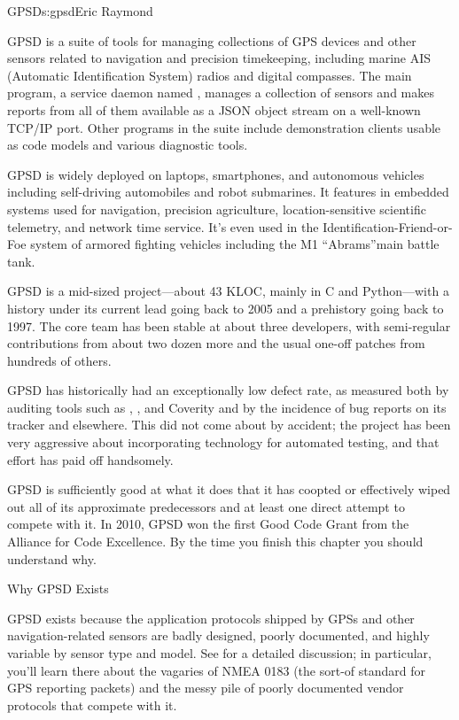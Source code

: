 \begin{aosachapter}{GPSD}{s:gpsd}{Eric Raymond}


GPSD is a suite of tools for managing collections of GPS devices and other
sensors related to navigation and precision timekeeping, including
marine AIS (Automatic Identification System) radios and digital compasses. The main program, a service
daemon named , manages a collection of sensors and makes
reports from all of them available as a JSON object stream on a
well-known TCP/IP port.  Other programs in the suite include 
demonstration clients usable as code models and various diagnostic
tools.

GPSD is widely deployed on laptops, smartphones, and autonomous
vehicles including self-driving automobiles and robot submarines. It
features in embedded systems used for navigation, precision
agriculture, location-sensitive scientific telemetry, and network time
service. It's even used in the Identification-Friend-or-Foe system of
armored fighting vehicles including the M1 ``Abrams''main battle tank.

GPSD is a mid-sized project---about 43 KLOC, mainly in C and
Python---with a history under its current lead going back to 2005 and a
prehistory going back to 1997.  The core team has been stable at about
three developers, with semi-regular contributions from about two dozen
more and the usual one-off patches from hundreds of others.

GPSD has historically had an exceptionally low defect rate, as
measured both by auditing tools such as , , and Coverity
and by the incidence of bug reports on its tracker and elsewhere.
This did not come about by accident; the project has been very
aggressive about incorporating technology for automated testing, and
that effort has paid off handsomely.

GPSD is sufficiently good at what it does that it has coopted or
effectively wiped out all of its approximate predecessors and at least
one direct attempt to compete with it.  In 2010, GPSD won the first
Good Code Grant from the Alliance for Code Excellence.  By the time
you finish this chapter you should understand why.

\begin{aosasect1}{Why GPSD Exists}

GPSD exists because the application protocols shipped by GPSs and
other navigation-related sensors are badly designed, poorly
documented, and highly variable by sensor type and model. See
\cite{bib:gps-suck} for a detailed discussion; in particular, you'll 
learn there about the vagaries of NMEA 0183 (the sort-of standard for
GPS reporting packets) and the messy pile of poorly documented vendor
protocols that compete with it. 


\end{aosasect1}
\end{aosachapter}
